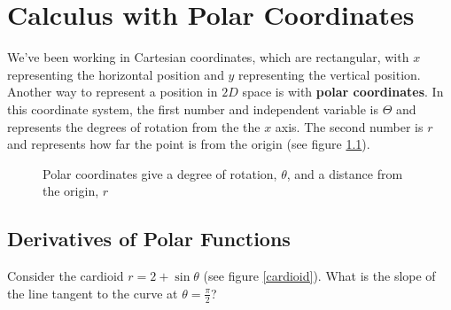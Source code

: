 \chapter{Calculus with Polar Coordinates}

We've been working in Cartesian coordinates, which are rectangular, with $x$ 
representing the horizontal position and $y$ representing the vertical 
position. Another way to represent a position in $2D$ space is with \textbf{
polar coordinates}. In this coordinate system, the 
first number and independent variable is $\Theta$ and represents the degrees 
of rotation from the the $x$ axis. The second number is $r$ and represents how 
far the point is from the origin (see figure \ref{polarex}). 

\begin{figure}[htbp]
\centering
    \label{polarex}
    \caption{Polar coordinates give a degree of rotation, $\theta$, and a 
    distance from the origin, $r$}
    \end{figure}

\section{Derivatives of Polar Functions}
Consider the cardioid $r = 2 + \sin{\theta}$ (see figure \ref{cardioid}). What 
is the slope of the line tangent to the curve at $\theta = \frac{\pi}{2}$? 

